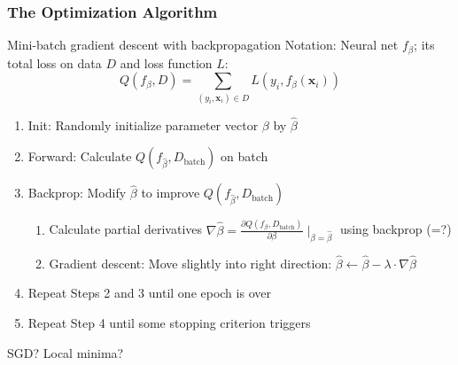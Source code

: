 \begin{frame}
	\frametitle{The Optimization Algorithm}
	\begin{block}{Mini-batch gradient descent with backpropagation}
		Notation: Neural net $f_\beta$; its total loss on data $D$ and loss function $L$: 
		\vspace{-0.5em}
		$$
		Q(f_\beta, D) = \sum_{(y_i, \boldsymbol x_i) \in D} L(y_i, f_\beta(\boldsymbol x_i))
		$$
		\vspace{-1.2em}
		\begin{enumerate}
			\item Init: Randomly initialize parameter vector $\beta$ by $\hat \beta$
			\item Forward: Calculate $Q(f_{\hat\beta}, D_\text{batch})$ on \alert{batch}
			\item Backprop: Modify $\hat \beta$ to improve $Q(f_{\hat\beta}, D_\text{batch})$ 
			\begin{enumerate}
				\item Calculate partial derivatives $\nabla \hat \beta = \frac{\partial Q(f_\beta, D_\text{batch})}{\partial \beta}\mid_{\beta = \hat \beta}$ using backprop (=?)
				\item Gradient descent: Move slightly into right direction: $\hat \beta \leftarrow \hat \beta  - \lambda \cdot \nabla \hat \beta$
			\end{enumerate}
			\item Repeat Steps 2 and 3 until one \alert{epoch} is over
			\item Repeat Step 4 until some stopping criterion triggers
		\end{enumerate}
	\end{block}
	
	SGD? Local minima?
\end{frame}

